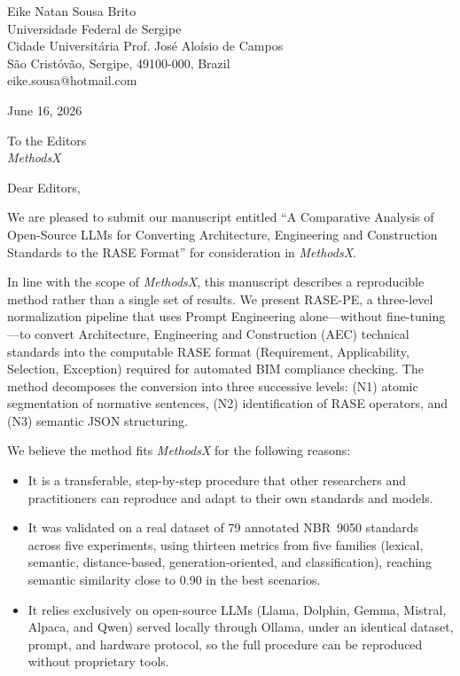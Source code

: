 \documentclass[11pt]{article}
\begin{document}
\noindent Eike Natan Sousa Brito \\
Universidade Federal de Sergipe \\
Cidade Universit\'aria Prof. Jos\'e Alo\'isio de Campos \\
S\~ao Crist\'ov\~ao, Sergipe, 49100-000, Brazil \\
eike.sousa@hotmail.com

\bigskip
\noindent June 16, 2026

\bigskip
\noindent To the Editors \\
\textit{MethodsX}

\bigskip
\noindent Dear Editors,

We are pleased to submit our manuscript entitled ``A Comparative Analysis of
Open-Source LLMs for Converting Architecture, Engineering and Construction
Standards to the RASE Format'' for consideration in \textit{MethodsX}.

In line with the scope of \textit{MethodsX}, this manuscript describes a
reproducible method rather than a single set of results. We present RASE-PE, a
three-level normalization pipeline that uses Prompt Engineering alone---without
fine-tuning---to convert Architecture, Engineering and Construction (AEC)
technical standards into the computable RASE format (Requirement, Applicability,
Selection, Exception) required for automated BIM compliance checking. The method
decomposes the conversion into three successive levels: (N1) atomic segmentation
of normative sentences, (N2) identification of RASE operators, and (N3) semantic
JSON structuring.

We believe the method fits \textit{MethodsX} for the following reasons:

\begin{itemize}
  \item It is a transferable, step-by-step procedure that other researchers and
        practitioners can reproduce and adapt to their own standards and models.
  \item It was validated on a real dataset of 79 annotated NBR~9050 standards
        across five experiments, using thirteen metrics from five families
        (lexical, semantic, distance-based, generation-oriented, and
        classification), reaching semantic similarity close to 0.90 in the best
        scenarios.
  \item It relies exclusively on open-source LLMs (Llama, Dolphin, Gemma,
        Mistral, Alpaca, and Qwen) served locally through Ollama, under an
        identical dataset, prompt, and hardware protocol, so the full procedure
        can be reproduced without proprietary tools.
\end{itemize}
\end{document}
